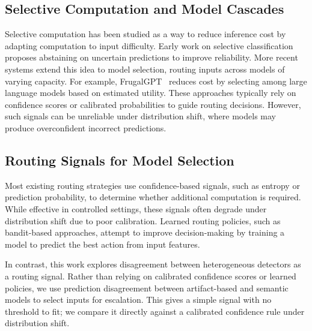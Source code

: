 \documentclass{ieeeaccess}
\begin{document}
\subsection{Selective Computation and Model Cascades}

Selective computation has been studied as a way to reduce inference cost by adapting computation to input difficulty. Early work on selective classification~\cite{NIPS2017_4a8423d5} proposes abstaining on uncertain predictions to improve reliability. More recent systems extend this idea to model selection, routing inputs across models of varying capacity. For example, FrugalGPT~\cite{chen2024frugalgpt} reduces cost by selecting among large language models based on estimated utility. These approaches typically rely on confidence scores or calibrated probabilities to guide routing decisions. However, such signals can be unreliable under distribution shift, where models may produce overconfident incorrect predictions.

\subsection{Routing Signals for Model Selection}

Most existing routing strategies use confidence-based signals, such as entropy or prediction probability, to determine whether additional computation is required. While effective in controlled settings, these signals often degrade under distribution shift due to poor calibration. Learned routing policies, such as bandit-based approaches, attempt to improve decision-making by training a model to predict the best action
from input features.

In contrast, this work explores disagreement between heterogeneous detectors as a routing signal. Rather than relying on calibrated confidence scores or learned policies, we use prediction disagreement between artifact-based and semantic models to select inputs for escalation. This gives a simple signal with no threshold to fit; we compare it directly against a calibrated confidence rule under distribution shift.
\end{document}
